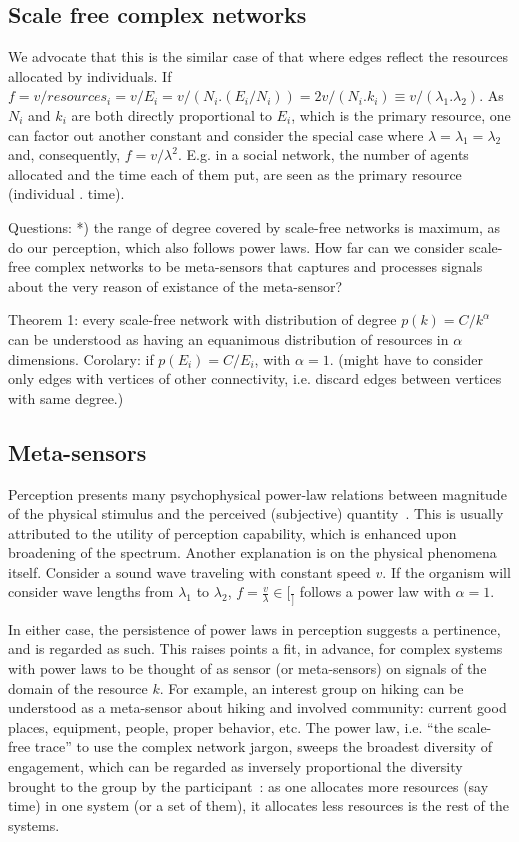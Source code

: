 \documentclass[a4paper, 11pt]{article} %
\begin{document}
\subsection{Scale free complex networks}
We advocate that this is the similar case of that where edges reflect the resources allocated by individuals. If $f=v/resources_i=v/E_i=v/(N_i . (E_i/N_i))=2v/(N_i . k_i) \equiv v / (\lambda_1 .   \lambda_2)$. As $N_i$ and $k_i$ are both directly proportional to $E_i$, which is the primary resource, one can factor out another constant and consider the special case where $\lambda=\lambda_1=\lambda_2$ and, consequently, $f=v/\lambda^2$. E.g. in a social network, the number of agents allocated and the time each of them put, are seen as the primary resource (individual . time).

Questions:
*) the range of degree covered by scale-free networks is maximum, as do our perception, which also follows power laws. How far can we consider scale-free complex networks to be meta-sensors that captures and processes signals about the very reason of existance of the meta-sensor?

Theorem 1: every scale-free network with distribution of degree $p(k)=C/k^\alpha$ can be understood as having an equanimous distribution of resources in $\alpha$ dimensions.
Corolary: if $p(E_i)=C/E_i$, with $\alpha=1$. (might have to consider only edges with vertices of other connectivity, i.e. discard edges between vertices with same degree.)

\subsection{Meta-sensors}
Perception presents many psychophysical power-law 
relations between
magnitude of the physical stimulus and the perceived 
(subjective) quantity~\cite{stev,web}.
This is usually attributed to the utility of perception capability,
which is enhanced upon broadening of the spectrum.
Another explanation is on the physical phenomena itself.
Consider a sound wave traveling with constant speed $v$.
If the organism will consider wave lengths from $\lambda_1$
to $\lambda_2$, $f=\frac{v}{\lambda} \in [\frac{}]$ follows
a power law with $\alpha=1$.

In either case, the persistence of power laws in perception
suggests a pertinence, and is regarded as such. This raises
points a fit, in advance, for complex systems with power laws
to be thought of as sensor (or meta-sensors) on signals
of the domain of the resource $k$.
For example, an interest group on hiking can be understood as
a meta-sensor about hiking and involved community: current good
places, equipment, people, proper behavior, etc.
The power law, i.e. ``the scale-free trace'' to use
the complex network jargon, sweeps the broadest 
diversity of engagement, which can be regarded as
inversely proportional the diversity brought to the group
by the participant~\cite{tStable}: 
as one allocates more resources (say time)
in one system (or a set of them),
it allocates less resources is the rest of the systems.
\end{document}
